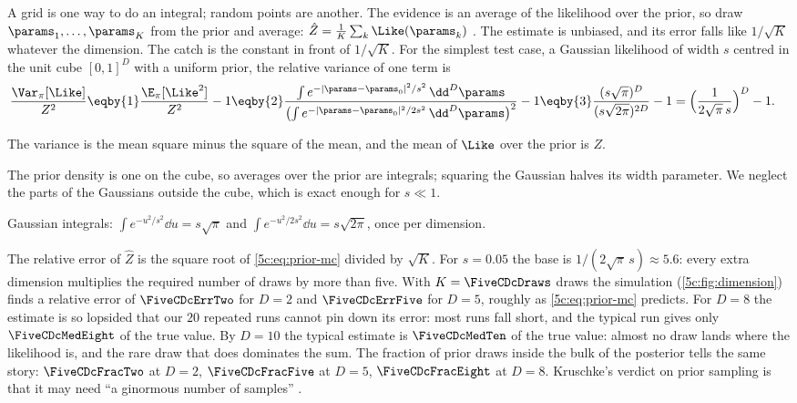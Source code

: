 A grid is one way to do an integral; random points are another. The evidence is an
average of the likelihood over the prior, so draw $\params_1,\dots,\params_K$ from the
prior and average: $\hat Z=\frac1K\sum_k\Like(\params_k)$ . The
estimate is unbiased, and its error falls like $1/\sqrt K$ whatever the dimension. The
catch is the constant in front of $1/\sqrt K$. For the simplest test case, a Gaussian
likelihood of width $s$ centred in the unit cube $[0,1]^D$ with a uniform prior, the
relative variance of one term is
\begin{align}
  \frac{\Var_\pi[\Like]}{Z^2}
  &\eqby{1}\frac{\E_\pi[\Like^2]}{Z^2}-1
   \eqby{2}\frac{\int e^{-\lvert\params-\params_0\rvert^2/s^2}\,\dd^D\params}
     {\bigl(\int e^{-\lvert\params-\params_0\rvert^2/2s^2}\,\dd^D\params\bigr)^2}-1
   \eqby{3}\frac{(s\sqrt\pi)^D}{(s\sqrt{2\pi})^{2D}}-1
   =\Bigl(\frac{1}{2\sqrt\pi\,s}\Bigr)^{D}-1 .
  \label{5c:eq:prior-mc}
\end{align}
\begin{explain}
  \item The variance is the mean square minus the square of the mean, and the mean of
        $\Like$ over the prior is $Z$.
  \item The prior density is one on the cube, so averages over the prior are integrals;
        squaring the Gaussian halves its width parameter. We neglect the parts of the
        Gaussians outside the cube, which is exact enough for $s\ll1$.
  \item Gaussian integrals: $\int e^{-u^2/s^2}\dd u=s\sqrt\pi$ and
        $\int e^{-u^2/2s^2}\dd u=s\sqrt{2\pi}$, once per dimension.
\end{explain}
The relative error of $\hat Z$ is the square root of \eqref{5c:eq:prior-mc} divided by
$\sqrt K$. For $s=0.05$ the base is $1/(2\sqrt\pi\,s)\approx5.6$: every extra dimension
multiplies the required number of draws by more than five. With $K=\FiveCDcDraws$ draws
the simulation (\cref{5c:fig:dimension}) finds a relative error of $\FiveCDcErrTwo$ for
$D=2$ and $\FiveCDcErrFive$ for $D=5$, roughly as \eqref{5c:eq:prior-mc} predicts. For $D=8$
the estimate is so lopsided that our $20$ repeated runs cannot pin down its error: most
runs fall short, and the typical run gives only $\FiveCDcMedEight$ of the true value.
By $D=10$ the typical estimate is $\FiveCDcMedTen$ of the
true value: almost no draw lands where the likelihood is, and the rare draw that does
dominates the sum. The fraction of prior draws inside the bulk of the posterior tells
the same story: $\FiveCDcFracTwo$ at $D=2$, $\FiveCDcFracFive$ at $D=5$,
$\FiveCDcFracEight$ at $D=8$. Kruschke's verdict on prior sampling is that it may need
``a ginormous number of samples'' .

